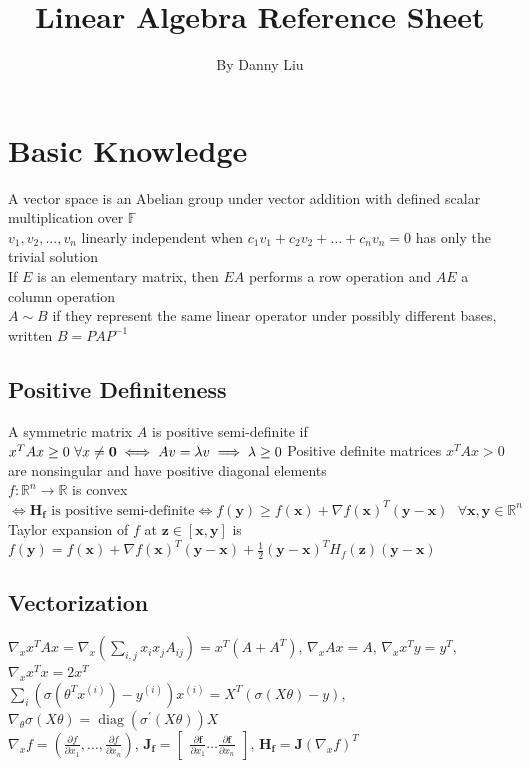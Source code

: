 \documentclass{article}
\title{Linear Algebra Reference Sheet}
\author{By Danny Liu}
\date{}
\DeclareMathOperator{\diag}{diag}
\newcommand{\F}{\mathbb{F}}
\newcommand{\real}{\mathbb{R}}
\begin{document}
\maketitle

\section{Basic Knowledge}
A vector space is an Abelian group under vector addition with defined scalar multiplication over $\F$ \\
$v_1, v_2, ..., v_n$ linearly independent when $c_1v_1 + c_2v_2 + \ldots + c_nv_n = 0$ has only the trivial solution\\
If $E$ is an elementary matrix, then $EA$ performs a row operation and $AE$ a column operation \\
$A \sim B$ if they represent the same linear operator under possibly different bases, written ${B = PAP^{-1}}$  

\subsection{Positive Definiteness}
A symmetric matrix $A$ is positive semi-definite if $x^TAx \geq 0 \mbox{ } \forall x \neq \boldsymbol{0} \iff Av = \lambda v \implies \lambda \geq 0 \\$
Positive definite matrices $x^TAx > 0$ are nonsingular and have positive diagonal elements \\
$f: \real^n \rightarrow \real$ is convex $\iff {\boldsymbol{H}_{\boldsymbol{f}} \mbox{ is positive semi-definite} \iff f(\boldsymbol{y}) \geq f(\boldsymbol{x}) + {\nabla f(\boldsymbol{x})}^T (\boldsymbol{y}-\boldsymbol{x}) \mbox{ }\forall \boldsymbol{x}, \boldsymbol{y} \in \real^n }$\\
Taylor expansion of $f$ at $\boldsymbol{z} \in [\boldsymbol{x}, \boldsymbol{y}]$ is $f(\boldsymbol{y}) =  f(\boldsymbol{x}) + {\nabla f(\boldsymbol{x})}^T (\boldsymbol{y}-\boldsymbol{x}) + \frac{1}{2}(\boldsymbol{y}-\boldsymbol{x})^TH_f(\boldsymbol{z})(\boldsymbol{y}-\boldsymbol{x})$

\subsection{Vectorization}
$\nabla_x x^TAx = \nabla_x (\sum_{i, j}x_i x_j A_{ij}) = x^T(A + A^T)$, $\nabla_x Ax = A$, $\nabla_x x^Ty = y^T$, $\nabla_x x^Tx = 2x^T$ \\
$\sum_i(\sigma(\theta^Tx^{(i)}) - y^{(i)})x^{(i)} = X^T(\sigma(X\theta) - y)$, $\nabla_\theta \sigma(X\theta) = \diag(\sigma^\prime (X\theta))X$ \\
$\nabla_x f = (\frac{\partial f}{\partial x_1}, \ldots , \frac{\partial f}{\partial x_n})$, $\boldsymbol{J}_{\boldsymbol{f}} = \begin{bmatrix} \frac{\partial \boldsymbol{f}}{\partial x_1} \ldots \frac{\partial \boldsymbol{f}}{\partial x_n} \end{bmatrix}$, $\boldsymbol{H}_{\boldsymbol{f}} = \boldsymbol{J}(\nabla_x f)^T$
\end{document}
